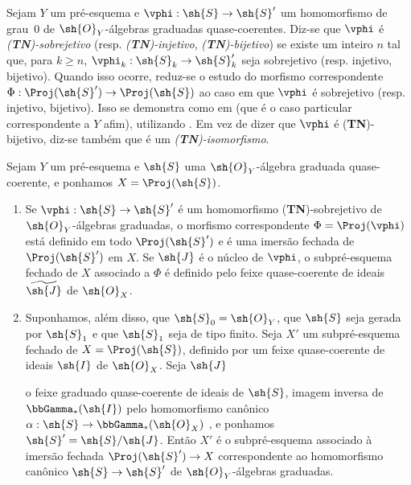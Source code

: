 \documentclass[oneside,10pt]{amsart}
\makeatletter
\renewcommand{\geq}{\geqslant}
\newcommand{\ega@arrow}[2]{\mathchoice{#1}{#2}{#2}{#2}}
\renewcommand{\to}{\ega@arrow{\longrightarrow}{\rightarrow}}
\newcommand{\oldpage}[2][]{\marginnote{\normalfont\footnotesize\textbf{#1}~|~#2}\ignorespaces}
\let\EGAOriginalLabel\label
\renewcommand{\label}[1]{\phantomsection\EGAOriginalLabel{#1}}
\makeatother
\begin{document}
\begin{env}[3.6.1]
\label{II.3.6.1}
Sejam $Y$ um pré-esquema e $\vphi:\sh{S}\to\sh{S}'$ um homomorfismo de grau~$0$ de $\sh{O}_Y$-álgebras graduadas quase-coerentes.
Diz-se que $\vphi$ é \emph{(\textbf{TN})-sobrejetivo} (resp. \emph{(\textbf{TN})-injetivo}, \emph{(\textbf{TN})-bijetivo}) se existe um inteiro $n$ tal que, para $k\geq n$, $\vphi_k:\sh{S}_k\to\sh{S}'_k$ seja sobrejetivo (resp. injetivo, bijetivo).
Quando isso ocorre, reduz-se o estudo do morfismo correspondente $\Phi:\Proj(\sh{S}')\to\Proj(\sh{S})$ ao caso em que $\vphi$ é sobrejetivo (resp. injetivo, bijetivo).
Isso se demonstra como em  (que é o caso particular correspondente a $Y$ afim), utilizando .
Em vez de dizer que $\vphi$ é (\textbf{TN})-bijetivo, diz-se também que é um \emph{(\textbf{TN})-isomorfismo}.
\end{env}

\begin{proposition}[3.6.2]
\label{II.3.6.2}
Sejam $Y$ um pré-esquema e $\sh{S}$ uma $\sh{O}_Y$-álgebra graduada quase-coerente, e ponhamos $X=\Proj(\sh{S})$.
\begin{enumerate}
  \item[(i)] Se $\vphi:\sh{S}\to\sh{S}'$ é um homomorfismo (\textbf{TN})-sobrejetivo de $\sh{O}_Y$-álgebras graduadas, o morfismo correspondente $\Phi=\Proj(\vphi)$  está definido em todo $\Proj(\sh{S}')$ e é uma imersão fechada de $\Proj(\sh{S}')$ em $X$.
    Se $\sh{J}$ é o núcleo de $\vphi$, o subpré-esquema fechado de $X$ associado a $\Phi$ é definido pelo feixe quase-coerente de ideais $\widetilde{\sh{J}}$ de $\sh{O}_X$.
  \item[(ii)] Suponhamos, além disso, que $\sh{S}_0=\sh{O}_Y$, que $\sh{S}$ seja gerada por $\sh{S}_1$ e que $\sh{S}_1$ seja de tipo finito.
    Seja $X'$ um subpré-esquema fechado de $X=\Proj(\sh{S})$, definido por um feixe quase-coerente de ideais $\sh{I}$ de $\sh{O}_X$.
    Seja $\sh{J}$
\oldpage[II]{65}

o feixe graduado quase-coerente de ideais de $\sh{S}$, imagem inversa de $\bbGamma_*(\sh{I})$ pelo homomorfismo canônico $\alpha:\sh{S}\to\bbGamma_*(\sh{O}_X)$ , e ponhamos $\sh{S}'=\sh{S}/\sh{J}$.
Então $X'$ é o subpré-esquema associado  à imersão fechada $\Proj(\sh{S}')\to X$ correspondente ao homomorfismo canônico $\sh{S}\to\sh{S}'$ de $\sh{O}_Y$-álgebras graduadas.
\end{enumerate}
\end{proposition}
\end{document}
